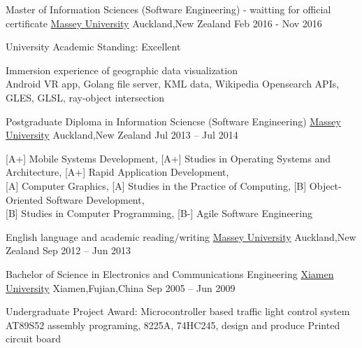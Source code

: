 
\begin{cventries}
\cventry
{Master of Information Sciences (Software Engineering) - waitting for official certificate}
{\href{http://www.massey.ac.nz/}{Massey University}}
{Auckland,\enskip New Zealand}
{Feb 2016 - Nov 2016}
{
	\begin{cvitems}
		\item{University Academic Standing: Excellent}
		\item {Immersion experience of geographic data visualization\\
			Android VR app, Golang file server, KML data, Wikipedia Opensearch APIs, GLES, GLSL, ray-object intersection}
	\end{cvitems}
}
\end{cventries}

\begin{cventries}
	\cventry
	{Postgraduate Diploma in Information Sciencse (Software Engineering)}
	{\href{http://www.massey.ac.nz/}{Massey University}}
	{Auckland,\enskip New Zealand}
	{Jul 2013 – Jul 2014}
	{
		\begin{cvitems}
			\item{[A+] Mobile Systems Development},\enskip
			{[A+] Studies in Operating Systems and Architecture},\enskip
			{[A+] Rapid Application Development},\enskip\\
			{[A] Computer Graphics},\enskip
			{[A] Studies in the Practice of Computing},\enskip
			{[B] Object-Oriented Software Development},\enskip\\
			{[B] Studies in Computer Programming},\enskip
			{[B-] Agile Software Engineering}\enskip
		\end{cvitems}
	}
\end{cventries}

\begin{cventries}
	\cventry
	{English language and academic reading/writing}
	{\href{http://www.massey.ac.nz/}{Massey University}}
	{Auckland,\enskip New Zealand}
	{Sep 2012 – Jun 2013}
	{
		\begin{cvitems}
		\end{cvitems}
	}
\end{cventries}

\begin{cventries}
	\cventry
	{Bachelor of Science in Electronics and Communications Engineering}
	{\href{http://www.xmu.edu.cn/en/}{Xiamen University}}
	{Xiamen,\enskip Fujian,\enskip China}
	{Sep 2005 – Jun 2009}
	{
		\begin{cvitems}
			\item {Undergraduate Project Award: Microcontroller based traffic light control system\\
			AT89S52 assembly programing, 8225A, 74HC245, design and produce Printed circuit board}
		\end{cvitems}
	}
\end{cventries}

